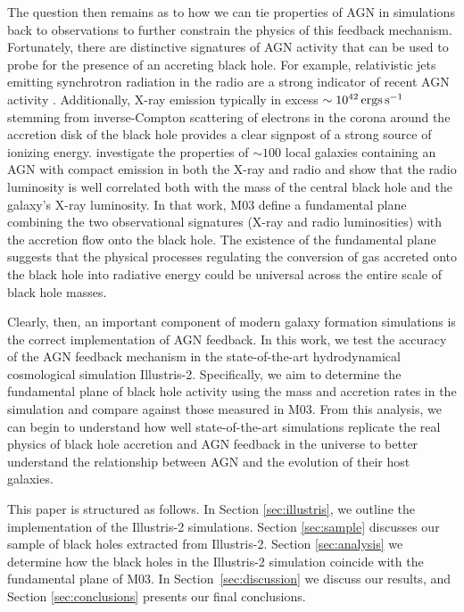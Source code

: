 The question then remains as to how we can tie properties of AGN in
simulations back to observations to further constrain the physics
of this feedback mechanism. Fortunately, there are distinctive signatures
of AGN activity that can be used to probe for the presence of an accreting
black hole. For example, relativistic jets emitting synchrotron radiation
in the radio are a strong indicator of recent AGN activity \citep{jones1974}.
Additionally, X-ray emission typically in excess $\sim10^{42}\,{\rm ergs}\,{\rm s^{-1}}$
stemming from inverse-Compton scattering of electrons in the corona
around the accretion disk of the black hole provides a clear signpost
of a strong source of ionizing energy. \citet[hereafter, M03]{merloni2003afundamental}
investigate the properties of $\sim100$ local galaxies containing
an AGN with compact emission in both the X-ray and radio and show
that the radio luminosity is well correlated both with the mass of
the central black hole and the galaxy's X-ray luminosity. In that
work, M03 define a fundamental plane combining the two observational
signatures (X-ray and radio luminosities) with the accretion flow
onto the black hole. The existence of the fundamental plane suggests
that the physical processes regulating the conversion of gas accreted
onto the black hole into radiative energy could be universal across
the entire scale of black hole masses.

Clearly, then, an important component of modern galaxy formation simulations
is the correct implementation of AGN feedback. In this work, we test
the accuracy of the AGN feedback mechanism in the state-of-the-art
hydrodynamical cosmological simulation Illustris-2. Specifically,
we aim to determine the fundamental plane of black hole activity using
the mass and accretion rates in the simulation and compare against
those measured in M03. From this analysis, we can begin to understand
how well state-of-the-art simulations replicate the real physics of
black hole accretion and AGN feedback in the universe to better understand
the relationship between AGN and the evolution of their host galaxies.

This paper is structured as follows. In Section \ref{sec:illustris},
we outline the implementation of the Illustris-2 simulations. Section
\ref{sec:sample} discusses our sample of black holes extracted from
Illustris-2. Section \ref{sec:analysis} we determine how the black
holes in the Illustris-2 simulation coincide with the fundamental
plane of M03. In Section~\ref{sec:discussion} we discuss our results,
and Section \ref{sec:conclusions} presents our final conclusions.
